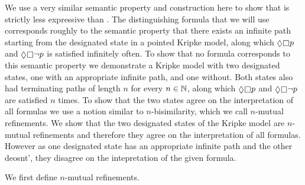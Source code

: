 We use a very similar semantic property and construction here to show that \logicRmlKF{} is strictly less expressive than \logicMuKF{}.
The distinguishing \langMu{} formula that we will use corresponds roughly to the semantic property that there exists an infinite path starting from the designated state in a pointed Kripke model, along which $\possible \necessary \atomP$ and $\possible \necessary \lnot \atomP$ is satisfied infinitely often.
To show that no \langRml{} formula corresponds to this semantic property we demonstrate a \classKF{} Kripke model with two designated states, one with an appropriate infinite path, and one without.
Both states also had terminating paths of length $n$ for every $n \in \mathbb{N}$, along which $\possible \necessary \atomP$ and $\possible \necessary \lnot \atomP$ are satisfied $n$ times.
To show that the two states agree on the interpretation of all \langRml{} formulas we use a notion similar to $n$-bisimilarity, which we call $n$-mutual refinements.
We show that the two designated states of the Kripke model are $n$-mutual refinements and therefore they agree on the interpretation of all \langRml{} formulas. 
However as one designated state has an appropriate infinite path and the other deosnt', they disagree on the intepretation of the given \langMu{} formula.

We first define $n$-mutual refinements.


